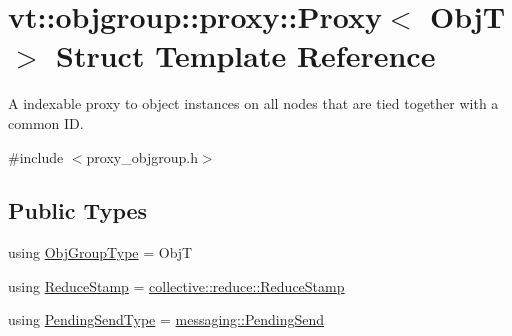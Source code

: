 \hypertarget{structvt_1_1objgroup_1_1proxy_1_1_proxy}{}\section{vt\+:\+:objgroup\+:\+:proxy\+:\+:Proxy$<$ ObjT $>$ Struct Template Reference}
\label{structvt_1_1objgroup_1_1proxy_1_1_proxy}


A indexable proxy to object instances on all nodes that are tied together with a common ID.  




{\ttfamily \#include $<$proxy\+\_\+objgroup.\+h$>$}

\subsection*{Public Types}
\begin{DoxyCompactItemize}
\item 
using \hyperlink{structvt_1_1objgroup_1_1proxy_1_1_proxy_a6f11b9652eee64f87bdff5a83fe1f7bb}{Obj\+Group\+Type} = ObjT
\item 
using \hyperlink{structvt_1_1objgroup_1_1proxy_1_1_proxy_a337be4c20cf11ff6477c7a66208cc909}{Reduce\+Stamp} = \hyperlink{namespacevt_1_1collective_1_1reduce_a7b7cb3021ac5654d92825d9fab0250b2}{collective\+::reduce\+::\+Reduce\+Stamp}
\item 
using \hyperlink{structvt_1_1objgroup_1_1proxy_1_1_proxy_a1bdf8713203531d306702a024872bb08}{Pending\+Send\+Type} = \hyperlink{structvt_1_1messaging_1_1_pending_send}{messaging\+::\+Pending\+Send}
\end{DoxyCompactItemize}

